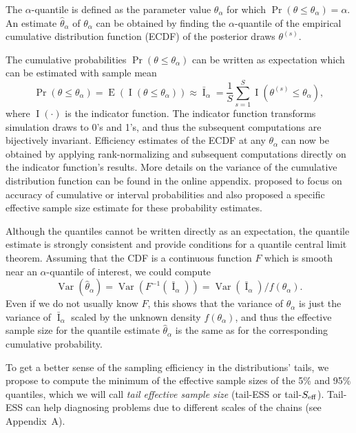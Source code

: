 \documentclass[american,]{article}
\DeclareMathOperator{\Var}{Var}
\DeclareMathOperator{\E}{E}
\DeclareMathOperator{\I}{I}
\theoremstyle{definition}
\begin{document}
The \(\alpha\)-quantile
is defined as the parameter value \(\theta_\alpha\) for which
\(\Pr(\theta \leq \theta_\alpha) = \alpha\). An estimate
\(\hat{\theta}_\alpha\) of \(\theta_\alpha\) can be obtained by
finding the \(\alpha\)-quantile of the empirical cumulative distribution function (ECDF) of the
posterior draws \(\theta^{(s)}\).

The cumulative probabilities \(\Pr(\theta \leq \theta_\alpha)\) can be
written as expectation which can be estimated with sample mean
\begin{equation}
\Pr(\theta \leq \theta_\alpha) = \E(\I(\theta \leq \theta_\alpha)) \approx \bar{\I}_\alpha = \frac{1}{S}\sum_{s=1}^S
\I(\theta^{(s)} \leq\theta_\alpha),
\end{equation}
where \(\I(\cdot)\) is the indicator function. The indicator function
transforms simulation draws to 0's and 1's, and thus the subsequent
computations are bijectively invariant.
%
Efficiency estimates of the ECDF at any \(\theta_\alpha\) can now be
obtained by applying rank-normalizing and subsequent computations
directly on the indicator function's results.
%
More details on the variance of the cumulative
distribution function can be found in the online appendix.
%
\citet{Raftery+Lewis:1992a} proposed to focus on accuracy of
cumulative or interval probabilities and also proposed a specific effective
sample size estimate for these probability estimates.

Although the quantiles cannot be written directly as an expectation,
the quantile estimate is strongly consistent and
\citet{Doss+etal:2014:MCMC-quantiles} provide conditions for a
quantile central limit theorem.
%
Assuming that the CDF is a continuous function \(F\) which is smooth
near an \(\alpha\)-quantile of interest, we could compute 
\begin{equation}
  \Var(\hat{\theta}_\alpha) = \Var(F^{-1}(\bar{\I}_\alpha)) = \Var(\bar{\I}_\alpha)/f(\theta_\alpha).
\end{equation}
%
Even if we do not usually know \(F\), this shows that the variance of
\(\theta_\alpha\) is just the variance of \(\bar{\I}_\alpha\) scaled by
the unknown density \(f(\theta_\alpha)\), and thus the
effective sample size for the quantile estimate
\(\hat{\theta}_\alpha\) is the same as for the corresponding
cumulative probability.

To get a better sense of the sampling efficiency in the
distributions' tails, we propose to compute the minimum of the effective
sample sizes of the 5\% and 95\% quantiles, which we will call
\emph{tail effective sample size} (tail-ESS or tail-\(S_{\rm eff}\)).
Tail-ESS can help diagnosing problems due to different scales of the
chains (see Appendix~A).
\end{document}
